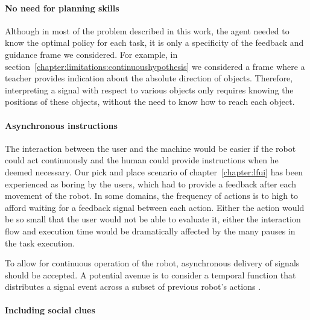 \paragraph{No need for planning skills}

Although in most of the problem described in this work, the agent needed to know the optimal policy for each task, it is only a specificity of the feedback and guidance frame we considered. For example, in section~\ref{chapter:limitations:continuoushypothesis} we considered a frame where a teacher provides indication about the absolute direction of objects. Therefore, interpreting a signal with respect to various objects only requires knowing the positions of these objects, without the need to know how to reach each object.


\paragraph{Asynchronous instructions}

The interaction between the user and the machine would be easier if the robot could act continuously and the human could provide instructions when he deemed necessary. Our pick and place scenario of chapter~\ref{chapter:lfui} has been experienced as boring by the users, which had to provide a feedback after each movement of the robot. In some domains, the frequency of actions is to high to afford waiting for a feedback signal between each action. Either the action would be so small that the user would not be able to evaluate it, either the interaction flow and execution time would be dramatically affected by the many pauses in the task execution.

To allow for continuous operation of the robot, asynchronous delivery of signals should be accepted. A potential avenue is to consider a temporal function that distributes a signal event across a subset of previous robot's actions \cite{hockley1984analysis,knox2009interactively}. 


\paragraph{Including social clues}

